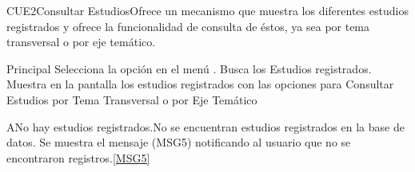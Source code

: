 

\begin{UseCase}{CUE2}{Consultar Estudios}{Ofrece un mecanismo que muestra los diferentes estudios registrados y ofrece la funcionalidad de consulta de éstos, ya sea por tema transversal o por eje temático.}
	\end{UseCase}
	
	
	
	
	
	\begin{UCtrayectoria}{Principal}
		\UCpaso[\UCactor] Selecciona la opción  en el menú .
		\UCpaso Busca los Estudios registrados.\label{Paso:CUE2BuscaEstudios}
		\UCpaso Muestra en la pantalla  los estudios registrados con las opciones para Consultar Estudios por Tema Transversal o por Eje Temático 
	\end{UCtrayectoria}

	\begin{UCtrayectoriaA}{A}{No hay estudios registrados.}{No se encuentran estudios registrados en la base de datos.}
			\UCpaso Se muestra el mensaje (MSG5) notificando al usuario que no se encontraron registros.\ref{MSG5}
	\end{UCtrayectoriaA}


